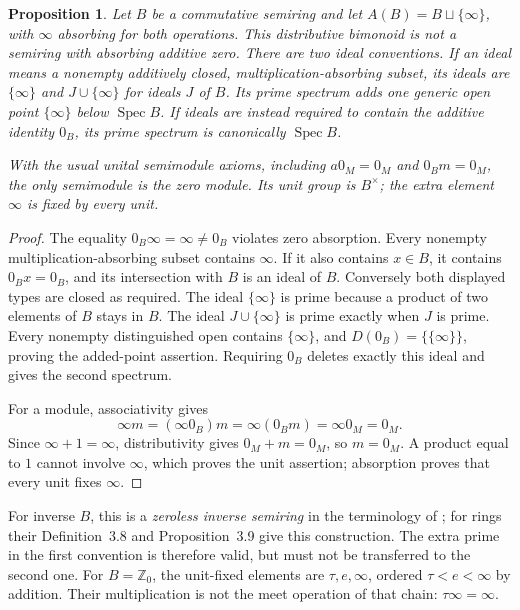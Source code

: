 \documentclass[11pt]{amsart}
\newcommand{\Z}{\mathbb Z}
\DeclareMathOperator{\Spec}{Spec}
\newtheorem{proposition}[theorem]{Proposition}
\theoremstyle{definition}
\theoremstyle{remark}
\begin{document}
\begin{proposition}\label{prop:absorber}
Let $B$ be a commutative semiring and let $A(B)=B\sqcup\{\infty\}$, with
$\infty$ absorbing for both operations. This distributive bimonoid is not
a semiring with absorbing additive zero. There are two ideal conventions.
If an ideal means a nonempty additively closed, multiplication-absorbing
subset, its ideals are $\{\infty\}$ and $J\cup\{\infty\}$ for ideals $J$
of $B$. Its prime spectrum adds one generic open point $\{\infty\}$ below
$\Spec B$. If ideals are instead required to contain the additive identity
$0_B$, its prime spectrum is canonically $\Spec B$.

With the usual unital semimodule axioms, including $a0_M=0_M$ and
$0_Bm=0_M$, the only semimodule is the zero module. Its unit group is
$B^\times$; the extra element $\infty$ is fixed by every unit.
\end{proposition}
\begin{proof}
The equality $0_B\infty=\infty\ne0_B$ violates zero absorption. Every
nonempty multiplication-absorbing subset contains $\infty$. If it also
contains $x\in B$, it contains $0_Bx=0_B$, and its intersection with $B$
is an ideal of $B$. Conversely both displayed types are closed as
required. The ideal $\{\infty\}$ is prime because a product of two elements
of $B$ stays in $B$. The ideal $J\cup\{\infty\}$ is prime exactly when
$J$ is prime. Every nonempty distinguished open contains $\{\infty\}$,
and $D(0_B)=\{\{\infty\}\}$, proving the added-point assertion. Requiring
$0_B$ deletes exactly this ideal and gives the second spectrum.

For a module, associativity gives
\[
 \infty m=(\infty0_B)m=\infty(0_Bm)=\infty0_M=0_M.
\]
Since $\infty+1=\infty$, distributivity gives $0_M+m=0_M$, so $m=0_M$.
A product equal to $1$ cannot involve $\infty$, which proves the unit
assertion; absorption proves that every unit fixes $\infty$.
\end{proof}

For inverse $B$, this is a \emph{zeroless inverse semiring} in the
terminology of \cite[\S3.1]{FGJM}; for rings their Definition~3.8 and
Proposition~3.9 give this construction. The extra prime in the first
convention is therefore valid, but must not be transferred to the second
one. For $B=\Z_0$, the unit-fixed elements are $\tau,e,\infty$, ordered
$\tau<e<\infty$ by addition. Their multiplication is not the meet
operation of that chain: $\tau\infty=\infty$.
\end{document}
